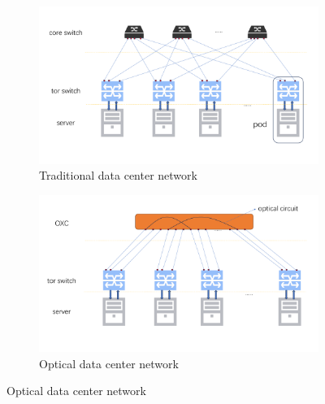\documentclass[conference]{IEEEtran}
\begin{document}
\begin{figure}[htbp]
	\centering
	\begin{subfigure}
		\centering
		\includegraphics[width=\linewidth]{./figure/picture1.pdf}
		\caption{Traditional data center network}
		\label{fig:sub1}
	\end{subfigure}
	\begin{subfigure}
		\centering
		\includegraphics[width=\linewidth]{./figure/picture2.pdf}
		\caption{Optical data center network}
		\label{fig:sub2}
	\end{subfigure}
	\label{fig:total}
\end{figure}

\end{document}
